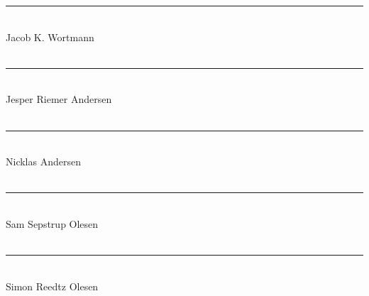 \setcounter{page}{5}
\thispagestyle{empty}

\noindent\rule{8cm}{0.03cm}\\
Jacob K. Wortmann\\\\

\noindent\rule{8cm}{0.03cm}\\ 
Jesper Riemer Andersen\\ \\

\noindent\rule{8cm}{0.03cm}\\
Nicklas Andersen\\\\

\noindent\rule{8cm}{0.03cm}\\
Sam Sepstrup Olesen\\\\

\noindent\rule{8cm}{0.03cm}\\
Simon Reedtz Olesen\\\\
